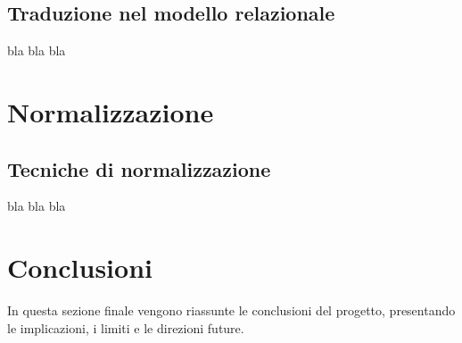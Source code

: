 \documentclass[12pt,a4paper]{article}
\begin{document}
    \subsection{Traduzione nel modello relazionale}
    bla bla bla
    
    \newpage
    \section{Normalizzazione}
    
    \subsection{Tecniche di normalizzazione}
    bla bla bla

    \section{Conclusioni}
    In questa sezione finale vengono riassunte le conclusioni del progetto, presentando le implicazioni, i limiti e le direzioni future.
\end{document}
